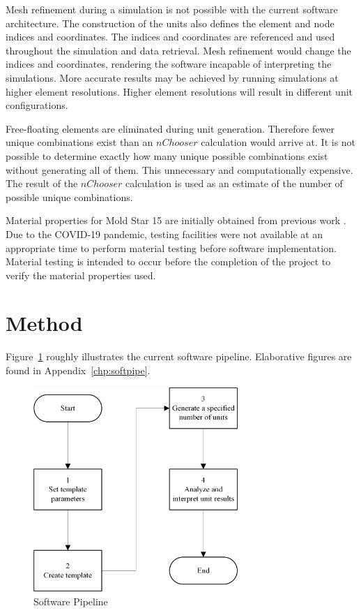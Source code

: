 Mesh refinement during a simulation is not possible with the current software architecture. The construction of the units also defines the element and node indices and coordinates. The indices and coordinates are referenced and used throughout the simulation and data retrieval. Mesh refinement would change the indices and coordinates, rendering the software incapable of interpreting the simulations. More accurate results may be achieved by running simulations at higher element resolutions. Higher element resolutions will result in different unit configurations.

Free-floating elements are eliminated during unit generation. Therefore fewer unique combinations exist than an $n Choose r$ calculation would arrive at. It is not possible to determine exactly how many unique possible combinations exist without generating all of them. This unnecessary and computationally expensive. The result of the $n Choose r$ calculation is used as an estimate of the number of possible unique combinations.

Material properties for Mold Star 15 are initially obtained from previous work \cite{Ellis2020}. Due to the COVID-19 pandemic, testing facilities were not available at an appropriate time to perform material testing before software implementation. Material testing is intended to occur before the completion of the project to verify the material properties used.

\section{Method}

Figure~\ref{fig:sp} roughly illustrates the current software pipeline. Elaborative figures are found in Appendix~\ref{chp:softpipe}.

\begin{figure}[H]
\begin{center}
	\includegraphics[width=0.7\textwidth]{sp.png}
	\caption{Software Pipeline}
	\label{fig:sp}
\end{center}
\end{figure}

